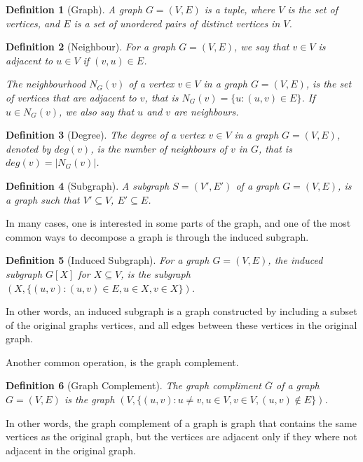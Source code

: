 \documentclass[a4paper]{article}
\newtheorem{definition}{Definition}[section]
\begin{document}
\begin{definition}[Graph]
    A graph $G = (V,E)$ is a tuple, where $V$ is the set of vertices, and $E$ is
    a set of unordered pairs of distinct vertices in $V$.
\end{definition}
\begin{definition}[Neighbour]
    For a graph $G = (V,E)$, we say that $v \in V$ is adjacent to 
    $u \in V$ if $(v,u) \in E$. 

    The neighbourhood $N_G(v)$ of a vertex $v \in V$ in a graph $G = (V,E)$,
    is the set of vertices that are adjacent to $v$, that is 
    $N_G(v) = \{u : (u,v) \in E \}$. If $u \in N_G(v)$, we also say
    that $u$ and $v$ are neighbours.
\end{definition}
\begin{definition}[Degree]
    The degree of a vertex $v \in V$ in a graph $G = (V,E)$, denoted by 
    $deg(v)$, is the number of neighbours of $v$ in $G$, that is 
    $deg(v) = |N_G(v)|$.
\end{definition}


\begin{definition}[Subgraph]
    A subgraph $S = (V',E')$ of a graph $G = (V,E)$, is a graph such that
    $V' \subseteq V$, $E' \subseteq E$.
\end{definition}
In many cases, one is interested in some parts of the graph, and one of the
most common ways to decompose a graph is through the induced subgraph.
\begin{definition}[Induced Subgraph]
    For a graph $G = (V,E)$, the induced subgraph $G[X]$ for $X \subseteq V$, is
    the subgraph $(X,\{(u,v) : (u,v) \in E, u \in X,v \in X\})$. 
\end{definition}

In other words, an induced subgraph is a graph constructed by including a
subset of the original graphs vertices, and all edges between these vertices in
the original graph.

Another common operation, is the graph complement.
\begin{definition}[Graph Complement]
    The graph compliment $\overline{G}$ of a graph $G = (V,E)$ is the graph 
    $(V,\{ (u,v) : u \neq v, u \in V,v \in V, (u,v) \notin E \})$.
\end{definition}

In other words, the graph complement of a
graph is graph that contains the same vertices as the original graph, but the
vertices are adjacent only if they where not adjacent in the original graph.
\end{document}
